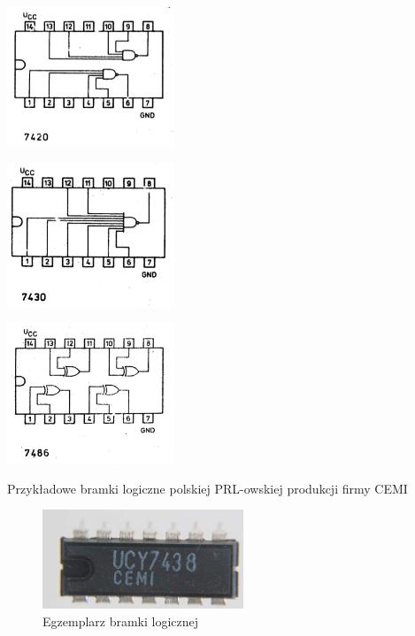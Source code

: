 \documentclass[a4paper,12pt]{article}
\begin{document}
\begin{table}[h!]
\begin{minipage}{5cm}
   \centering
   \includegraphics[width=5cm]{grafika/cemi/2nand.png}
\end{minipage}
\begin{minipage}{5cm}
   \centering
   \includegraphics[width=5cm]{grafika/cemi/1nand.png}
\end{minipage}
\begin{minipage}{5cm}
   \centering
   \includegraphics[width=5cm]{grafika/cemi/4xor.png}
\end{minipage}

\caption*{Przykładowe bramki logiczne polskiej PRL-owskiej produkcji firmy CEMI}
\end{table}

\begin{figure}[htb]
   \centering
   \includegraphics[width=6cm]{grafika/cemi/ucy7438.jpg}
   \caption*{Egzemplarz bramki logicznej}
\end{figure}
\end{document}
